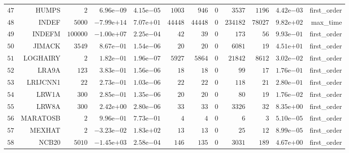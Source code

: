 \begin{longtable}{rrrrrrrrrrrr}
  \(    47\) & HUMPS & \(     2\) & \( 6.96\)e\(-09\) & \( 4.15\)e\(-05\) & \(  1003\) & \(   946\) & \(     0\) & \(  3537\) & \(  1196\) & \( 4.42\)e\(-03\) & first\_order \\
  \(    48\) & INDEF & \(  5000\) & \(-7.99\)e\(+14\) & \( 7.07\)e\(+01\) & \( 44448\) & \( 44448\) & \(     0\) & \(234182\) & \( 78027\) & \( 9.82\)e\(+02\) & max\_time \\
  \(    49\) & INDEFM & \(100000\) & \(-1.00\)e\(+07\) & \( 2.25\)e\(-04\) & \(    42\) & \(    39\) & \(     0\) & \(   173\) & \(    56\) & \( 9.93\)e\(-01\) & first\_order \\
  \(    50\) & JIMACK & \(  3549\) & \( 8.67\)e\(-01\) & \( 1.54\)e\(-06\) & \(    20\) & \(    20\) & \(     0\) & \(  6081\) & \(    19\) & \( 4.51\)e\(+01\) & first\_order \\
  \(    51\) & LOGHAIRY & \(     2\) & \( 1.82\)e\(-01\) & \( 1.96\)e\(-07\) & \(  5927\) & \(  5864\) & \(     0\) & \( 21842\) & \(  8612\) & \( 3.02\)e\(-02\) & first\_order \\
  \(    52\) & LRA9A & \(   123\) & \( 3.83\)e\(-01\) & \( 1.56\)e\(-06\) & \(    18\) & \(    18\) & \(     0\) & \(    99\) & \(    17\) & \( 1.76\)e\(-01\) & first\_order \\
  \(    53\) & LRIJCNN1 & \(    22\) & \( 2.73\)e\(-01\) & \( 1.03\)e\(-06\) & \(    22\) & \(    22\) & \(     0\) & \(   118\) & \(    21\) & \( 2.80\)e\(-01\) & first\_order \\
  \(    54\) & LRW1A & \(   300\) & \( 2.85\)e\(-01\) & \( 1.35\)e\(-06\) & \(    20\) & \(    20\) & \(     0\) & \(    80\) & \(    19\) & \( 1.76\)e\(-02\) & first\_order \\
  \(    55\) & LRW8A & \(   300\) & \( 2.42\)e\(+00\) & \( 2.80\)e\(-06\) & \(    33\) & \(    33\) & \(     0\) & \(  3326\) & \(    32\) & \( 8.35\)e\(+00\) & first\_order \\
  \(    56\) & MARATOSB & \(     2\) & \( 9.96\)e\(-01\) & \( 7.73\)e\(-01\) & \(     4\) & \(     4\) & \(     0\) & \(     6\) & \(     3\) & \( 5.10\)e\(-05\) & first\_order \\
  \(    57\) & MEXHAT & \(     2\) & \(-3.23\)e\(-02\) & \( 1.83\)e\(+02\) & \(    13\) & \(    13\) & \(     0\) & \(    25\) & \(    12\) & \( 8.99\)e\(-05\) & first\_order \\
  \(    58\) & NCB20 & \(  5010\) & \(-1.45\)e\(+03\) & \( 2.58\)e\(-04\) & \(   146\) & \(   135\) & \(     0\) & \(  3031\) & \(   189\) & \( 4.67\)e\(+00\) & first\_order \\

\end{longtable}

